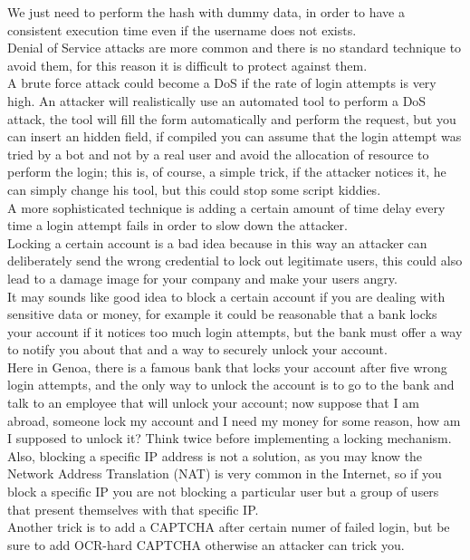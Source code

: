 We just need to perform the hash with dummy data, in order to have a consistent execution time even if the username does not exists.\\
Denial of Service attacks are more common and there is no standard technique to avoid them, for this reason it is difficult to protect against them.\\
A brute force attack could become a DoS if the rate of login attempts is very high. 
An attacker will realistically use an automated tool to perform a DoS attack, the tool will fill the form automatically and perform the request, but you can insert an hidden field, if compiled you can assume that the login attempt was tried by a bot and not by a real user and avoid the allocation of resource to perform the login; this is, of course, a simple trick, if the attacker notices it, he can simply change his tool, but this could stop some script kiddies.\\
A more sophisticated technique is adding a certain amount of time delay every time a login attempt fails in order to slow down the attacker.\\
Locking a certain account is a bad idea because in this way an attacker can deliberately send the wrong credential to lock out legitimate users, this could also lead to a damage image for your company and make your users angry.\\
It may sounds like good idea to block a certain account if you are dealing with sensitive data or money, for example it could be reasonable that a bank locks your account if it notices too much login attempts, but the bank must offer a way to notify you about that and a way to securely unlock your account.\\
Here in Genoa, there is a famous bank that locks your account after five wrong login attempts, and the only way to unlock the account is to go to the bank and talk to an employee that will unlock your account; now suppose that I am abroad, someone lock my account and I need my money for some reason, how am I supposed to unlock it?
Think twice before implementing a locking mechanism. \\

Also, blocking a specific IP address is not a solution, as you may know the Network Address Translation (NAT) is very common in the Internet, so if you block a specific IP you are not blocking a particular user but a group of users that present themselves with that specific IP.\\
Another trick is to add a CAPTCHA after certain numer of failed login, but be sure to add OCR-hard CAPTCHA otherwise an attacker can trick you.\\

